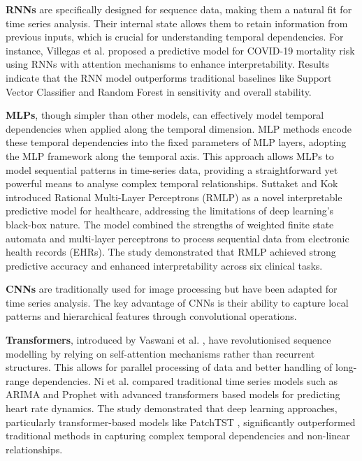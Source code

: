 \textbf{RNNs} are specifically designed for sequence data, making them a natural fit for time series analysis. Their internal state allows them to retain information from previous inputs, which is crucial for understanding temporal dependencies. For instance, Villegas et al. \cite{Villegas2023Predicting} proposed a predictive model for COVID-19 mortality risk using RNNs with attention mechanisms to enhance interpretability. Results indicate that the RNN model outperforms traditional baselines like Support Vector Classifier and Random Forest in sensitivity and overall stability.  

\textbf{MLPs}, though simpler than other models, can effectively model temporal dependencies when applied along the temporal dimension. MLP methods encode these temporal dependencies into the fixed parameters of MLP layers, adopting the MLP framework along the temporal axis. This approach allows MLPs to model sequential patterns in time-series data, providing a straightforward yet powerful means to analyse complex temporal relationships. Suttaket and Kok \cite{Suttaket2024Interpretable} introduced Rational Multi-Layer Perceptrons (RMLP) as a novel interpretable predictive model for healthcare, addressing the limitations of deep learning’s black-box nature. The model combined the strengths of weighted finite state automata and multi-layer perceptrons to process sequential data from electronic health records (EHRs). The study demonstrated that RMLP achieved strong predictive accuracy and enhanced interpretability across six clinical tasks. 

\textbf{CNNs} are traditionally used for image processing but have been adapted for time series analysis\cite{Muller2024IMU}. The key advantage of CNNs is their ability to capture local patterns and hierarchical features through convolutional operations.

\textbf{Transformers}, introduced by Vaswani et al. \cite{Vaswani2017Attention}, have revolutionised sequence modelling by relying on self-attention mechanisms rather than recurrent structures. This allows for parallel processing of data and better handling of long-range dependencies. Ni et al. \cite{Ni2024Time} compared traditional time series models such as ARIMA and Prophet with advanced transformers based models for predicting heart rate dynamics. The study demonstrated that deep learning approaches, particularly transformer-based models like PatchTST \cite{Nie2023Time}, significantly outperformed traditional methods in capturing complex temporal dependencies and non-linear relationships. 


